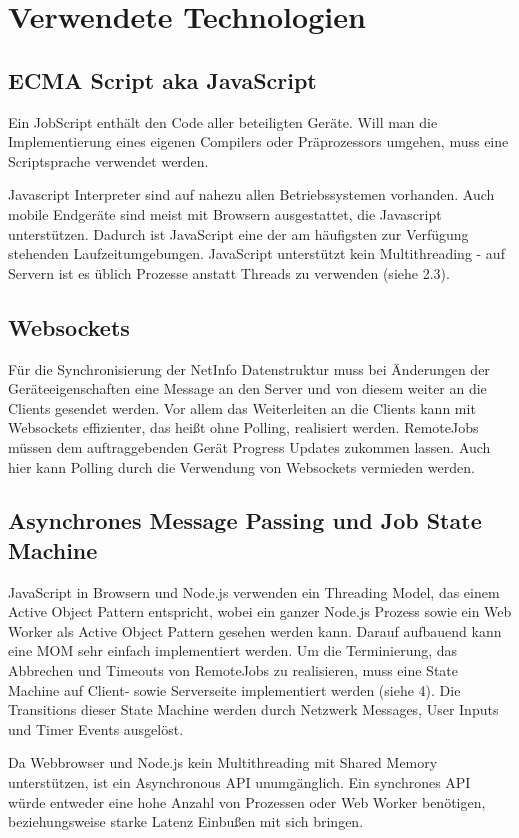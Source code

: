 \section{Verwendete Technologien}

\subsection{ECMA Script aka JavaScript}
Ein JobScript enthält den Code aller beteiligten Geräte.
Will man die Implementierung eines eigenen Compilers oder Präprozessors umgehen, muss eine Scriptsprache verwendet werden.

Javascript Interpreter sind auf nahezu allen Betriebssystemen vorhanden.
Auch mobile Endgeräte sind meist mit Browsern ausgestattet, die Javascript unterstützen.
Dadurch ist JavaScript eine der am häufigsten zur Verfügung stehenden Laufzeitumgebungen.
JavaScript unterstützt kein Multithreading - auf Servern ist es üblich Prozesse anstatt Threads zu verwenden (siehe 2.3).



\subsection{Websockets}
Für die Synchronisierung der NetInfo Datenstruktur muss bei Änderungen der Geräteeigenschaften eine Message an den Server und von diesem weiter an die Clients gesendet werden.
Vor allem das Weiterleiten an die Clients kann mit Websockets effizienter, das heißt ohne Polling, realisiert werden.
RemoteJobs müssen dem auftraggebenden Gerät Progress Updates zukommen lassen.
Auch hier kann Polling durch die Verwendung von Websockets vermieden werden.




\subsection{Asynchrones Message Passing und Job State Machine}
JavaScript in Browsern und Node.js verwenden ein Threading Model, das einem Active Object Pattern entspricht, wobei ein ganzer Node.js Prozess sowie ein Web Worker als Active Object Pattern gesehen werden kann.
Darauf aufbauend kann eine MOM sehr einfach implementiert werden.
Um die Terminierung, das Abbrechen und Timeouts von RemoteJobs zu realisieren, muss eine State Machine auf Client- sowie Serverseite implementiert werden (siehe 4).
Die Transitions dieser State Machine werden durch Netzwerk Messages, User Inputs und Timer Events ausgelöst.

Da Webbrowser und Node.js kein Multithreading mit Shared Memory unterstützen, ist ein Asynchronous API unumgänglich.
Ein synchrones API würde entweder eine hohe Anzahl von Prozessen oder Web Worker benötigen, beziehungsweise starke Latenz Einbußen mit sich bringen.

